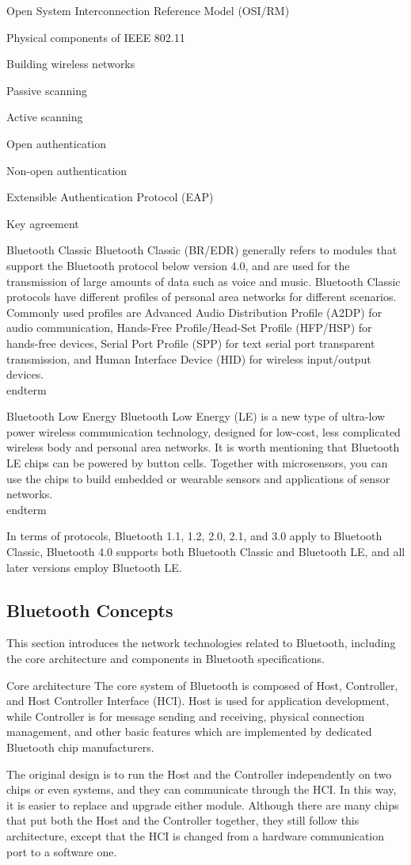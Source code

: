 \documentclass[a4paper,12pt]{book}
\begin{document}
\begin{term}{Open System Interconnection Reference Model (OSI/RM)}
\begin{term}{Physical components of IEEE 802.11}
\begin{term}{Building wireless networks}
\begin{term}{Passive scanning}
\begin{term}{Active scanning}
\begin{term}{Open authentication}
\begin{term}{Non-open authentication}
\begin{term}{Extensible Authentication Protocol (EAP)}
\begin{term}{Key agreement}
\begin{term}{Bluetooth Classic}
    Bluetooth Classic (BR/EDR) generally refers to modules that support the Bluetooth protocol below version 4.0, and are used for the transmission of large amounts of data such as voice and music. Bluetooth Classic protocols have different profiles of personal area networks for different scenarios. Commonly used profiles are Advanced Audio Distribution Profile (A2DP) for audio communication, Hands-Free Profile/Head-Set Profile (HFP/HSP) for hands-free devices, Serial Port Profile (SPP) for text serial port transparent transmission, and Human Interface Device (HID) for wireless input/output devices.
\\end{term}{}

\begin{term}{Bluetooth Low Energy}
    Bluetooth Low Energy (LE) is a new type of ultra-low power wireless communication technology, designed for low-cost, less complicated wireless body and personal area networks. It is worth mentioning that Bluetooth LE chips can be powered by button cells. Together with microsensors, you can use the chips to build embedded or wearable sensors and applications of sensor networks.
\\end{term}{}

In terms of protocols, Bluetooth 1.1, 1.2, 2.0, 2.1, and 3.0 apply to Bluetooth Classic, Bluetooth 4.0 supports both Bluetooth Classic and Bluetooth LE, and all later versions employ Bluetooth LE.

\subsection{Bluetooth Concepts}
This section introduces the network technologies related to Bluetooth, including the core architecture and components in Bluetooth specifications.

\begin{term}{Core architecture}
    The core system of Bluetooth is composed of Host, Controller, and Host Controller Interface (HCI). Host is used for application development, while Controller is for message sending and receiving, physical connection management, and other basic features which are implemented by dedicated Bluetooth chip manufacturers.

    \parskip 6pt
    The original design is to run the Host and the Controller independently on two chips or even systems, and they can communicate through the HCI. In this way, it is easier to replace and upgrade either module. Although there are many chips that put both the Host and the Controller together, they still follow this architecture, except that the HCI is changed from a hardware communication port to a software one.
    

\end{term}
\end{term}
\end{term}
\end{term}
\end{term}
\end{term}
\end{term}
\end{term}
\end{term}
\end{term}
\end{term}
\end{term}
\end{document}
